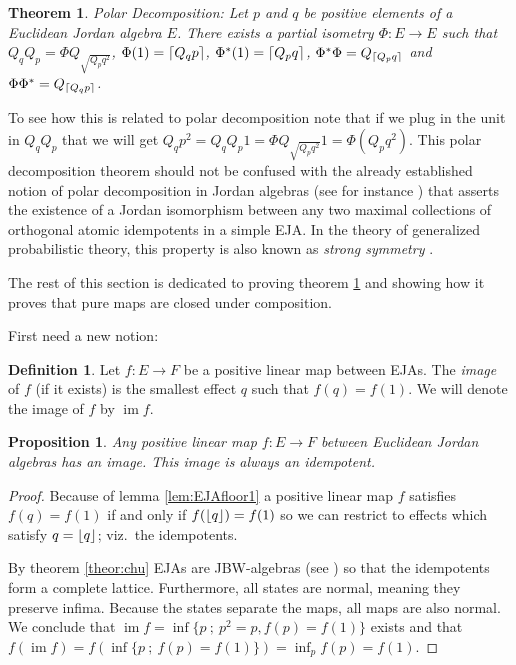 \documentclass[submission,copyright,creativecommons]{eptcs}
\newcounter{main}
\newtheorem{theorem}[main]{Theorem}
\newtheorem{proposition}[main]{Proposition}
\theoremstyle{definition}
\newtheorem{definition}[main]{Definition}
\DeclarePairedDelimiter{\ceil}{\lceil}{\rceil}
\DeclarePairedDelimiter{\floor}{\lfloor}{\rfloor}
\DeclareMathOperator{\im}{im}
\begin{document}
\begin{theorem}\label{theor:polardecomp}
    Polar Decomposition: Let $p$ and $q$ be positive elements
    of a Euclidean Jordan algebra $E$. There exists a partial
    isometry $\Phi: E\rightarrow E$
    such that $Q_qQ_p = \Phi Q_{\sqrt{Q_pq^2}}$,  $\Phi(1) = \ceil{Q_q p}$, $\Phi^*(1)
    = \ceil{Q_p q}$, $\Phi^*\Phi = Q_{\ceil{Q_p q}}$
    and $\Phi\Phi^* = Q_{\ceil{Q_q p}}$.
\end{theorem}
To see how this is related to polar decomposition note that if we plug in the unit in $Q_qQ_p$ that we will get $Q_q p^2 = Q_qQ_p1 = \Phi Q_{\sqrt{Q_pq^2}}1 = \Phi(Q_p q^2)$. This polar decomposition theorem should not be confused with the already established notion of polar decomposition in Jordan algebras (see for instance \cite[Ch. VI]{faraut1994analysis}) that asserts the existence of a Jordan isomorphism between any two maximal collections of orthogonal atomic idempotents in a simple EJA. In the theory of generalized probabilistic theory, this property is also known as \emph{strong symmetry} \cite{barnum2014higher}.

The rest of this section is dedicated to proving theorem \ref{theor:polardecomp} and showing how it proves that pure maps are closed under composition.

First need a new notion:
\begin{definition}
	Let $f:E\rightarrow F$ be a positive linear map between EJAs. The
	\emph{image} of $f$ (if it exists) is the smallest effect
	$q$ such that $f(q)=f(1)$. We will denote the image of $f$
	by $\im{f}$.
\end{definition}


\begin{proposition}\label{eja:im}
	Any positive linear map $f\colon E\rightarrow F$ between Euclidean
	Jordan algebras has an image. This image is always an
	idempotent.
\end{proposition}
\begin{proof}
	Because of lemma \ref{lem:EJAfloor1} a positive linear map $f$ satisfies $f(q)=f(1)$ if and only if $f(\floor{q})=f(1)$ so we can restrict to effects which satisfy $q=\floor{q}$; viz.~the idempotents.
	
	By theorem \ref{theor:chu} EJAs are JBW-algebras (see \cite{alfsen2012geometry}) so that the idempotents form a complete lattice. Furthermore, all states are normal, meaning they preserve infima. Because the states separate the maps, all maps are also normal. We conclude that $\im{f} = \inf\{p~;~p^2=p, f(p)=f(1)\}$ exists and that $f(\im{f}) = f(\inf\{p~;~f(p)=f(1)\})=\inf_p f(p) = f(1)$.
\end{proof}
\end{document}
